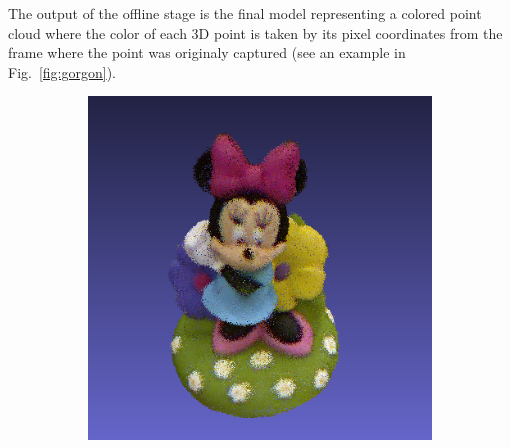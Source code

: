 \documentclass[letterpaper, 10 pt, conference]{ieeeconf}  %
\begin{document}
The output of the offline stage is the final model representing
a colored point cloud where the color of each 3D point is taken 
by its pixel coordinates from the frame where the point was originaly 
captured (see an example in Fig.~\ref{fig:gorgon}).

\begin{figure}[th]
	\centering
        \begin{subfigure}[b]{0.5\linewidth}
                \centering
                \includegraphics[width=\linewidth]{../models/mouse.png}
        \end{subfigure}%
        \begin{subfigure}[b]{0.5\linewidth}
                \centering

\end{subfigure}
\end{figure}
\end{document}
